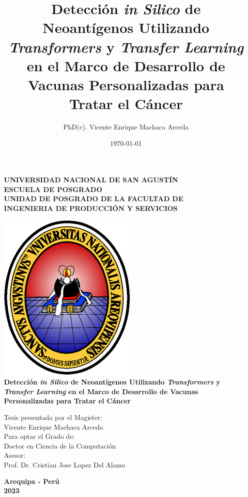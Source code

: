 \documentclass[a4paper]{article}
\title{Detección \textit{in Silico} de Neoantígenos Utilizando \textit{Transformers} y \textit{Transfer Learning} en el Marco de Desarrollo de Vacunas Personalizadas para Tratar el Cáncer }
\author{PhD(c). Vicente Enrique Machaca Arceda}
\date{\today}
\begin{document}
	
	\begin{center}
		\textbf{\Large{UNIVERSIDAD NACIONAL DE SAN AGUSTÍN}} \\
		\textbf{\large{ESCUELA DE POSGRADO} \\
			UNIDAD DE POSGRADO DE LA FACULTAD DE \\
			INGENIERIA DE PRODUCCIÓN Y SERVICIOS}\\
		\vspace*{1.5cm}
		
		\includegraphics[keepaspectratio,scale=0.6]{img/unsa} \\[.8cm]
		
		
		\textbf{\Large{ Detección \textit{in Silico} de Neoantígenos Utilizando \textit{Transformers} y \textit{Transfer Learning} en el Marco de Desarrollo de Vacunas Personalizadas para Tratar el Cáncer  }} \\
		
		
		\vspace*{1.2cm}
		\Large{}
		\begin{flushright}
	Tesis presentada por el Magister: \\
	Vicente Enrique Machaca Arceda \\
	\vskip 0.5cm
	Para optar el Grado de: \\
	Doctor en Ciencia de la Computación \\
	\vskip 0.5cm
	Asesor: \\
	Prof. Dr. Cristian Jose Lopez Del Alamo\\
	\end{flushright}
	
	
	\vskip 1cm
	\normalsize{}
	{\bf \large{Arequipa - Perú}} \\
	{\bf \large{2023}}
\end{center}
\end{document}
